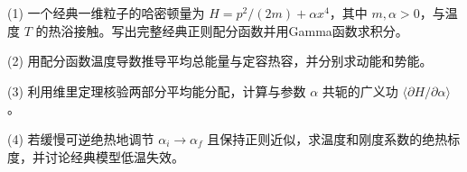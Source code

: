(1) 一个经典一维粒子的哈密顿量为 \(H=p^2/(2m)+\alpha x^4\)，其中 \(m,\alpha>0\)，与温度 \(T\) 的热浴接触。写出完整经典正则配分函数并用Gamma函数求积分。

(2) 用配分函数温度导数推导平均总能量与定容热容，并分别求动能和势能。

(3) 利用维里定理核验两部分平均能分配，计算与参数 \(\alpha\) 共轭的广义功 \(\langle\partial H/\partial\alpha\rangle\)。

(4) 若缓慢可逆绝热地调节 \(\alpha_i\to\alpha_f\) 且保持正则近似，求温度和刚度系数的绝热标度，并讨论经典模型低温失效。
